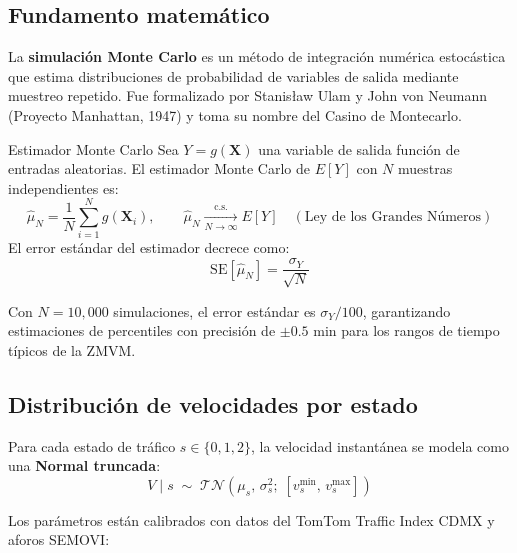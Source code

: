 \documentclass[12pt, a4paper]{article}
\theoremstyle{definition}
\begin{document}
\subsection{Fundamento matemático}

La \textbf{simulación Monte Carlo} es un método de integración numérica estocástica
que estima distribuciones de probabilidad de variables de salida mediante muestreo
repetido. Fue formalizado por Stanisław Ulam y John von Neumann (Proyecto Manhattan,
1947) y toma su nombre del Casino de Montecarlo.

\begin{cajadefinicion}{Estimador Monte Carlo}
Sea $Y = g(\mathbf{X})$ una variable de salida función de entradas aleatorias.
El estimador Monte Carlo de $E[Y]$ con $N$ muestras independientes es:
\begin{equation}
    \hat{\mu}_N = \frac{1}{N} \sum_{i=1}^{N} g(\mathbf{X}_i),
    \qquad
    \hat{\mu}_N \xrightarrow[N\to\infty]{\text{c.s.}} E[Y]
    \quad (\text{Ley de los Grandes Números})
    \label{eq:mc_estimator}
\end{equation}
El error estándar del estimador decrece como:
\begin{equation}
    \text{SE}[\hat{\mu}_N] = \frac{\sigma_Y}{\sqrt{N}}
    \label{eq:mc_error}
\end{equation}
\end{cajadefinicion}

Con $N = 10{,}000$ simulaciones, el error estándar es
$\sigma_Y / 100$, garantizando estimaciones de percentiles con
precisión de $\pm 0.5$ min para los rangos de tiempo típicos de la ZMVM.

\subsection{Distribución de velocidades por estado}

Para cada estado de tráfico $s \in \{0, 1, 2\}$, la velocidad instantánea
se modela como una \textbf{Normal truncada}:
\begin{equation}
    V \mid s \;\sim\; \mathcal{TN}\!\left(\mu_s,\, \sigma_s^2;\; [v^\text{min}_s,\, v^\text{max}_s]\right)
    \label{eq:truncated_normal}
\end{equation}

Los parámetros están calibrados con datos del TomTom Traffic Index CDMX
y aforos SEMOVI:
\end{document}
